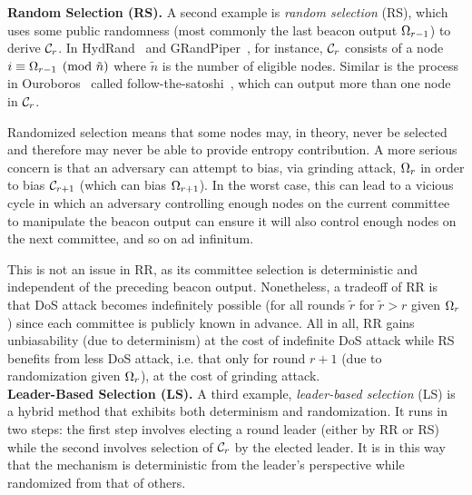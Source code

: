 \noindent\textbf{Random Selection (RS).} A second example is \textit{random selection} (RS), which uses some public randomness (most commonly the last beacon output $\Omega_{r - 1}$) to derive $\mathcal{C}_r$.
In HydRand~\cite{schindler2020hydrand} and GRandPiper~\cite{bhat2020randpiper}, for instance, $\mathcal{C}_r$ consists of a node $i \equiv \Omega_{r - 1} \pmod{\tilde{n}}$ where $\tilde{n}$ is the number of eligible nodes. Similar is the process in Ouroboros~\cite{kiayias2017ouroboros} called follow-the-satoshi~\cite{bentov2014proof,kiayias2017ouroboros}, which can output more than one node in $\mathcal{C}_r$.

Randomized selection means that some nodes may, in theory, never be selected and therefore may never be able to provide entropy contribution. A more serious concern is that an adversary can attempt to bias, via grinding attack, $\Omega_r$ in order to bias $\mathcal{C}_{r + 1}$ (which can bias $\Omega_{r + 1}$). In the worst case, this can lead to a vicious cycle in which an adversary controlling enough nodes on the current committee to manipulate the beacon output can ensure it will also control enough nodes on the next committee, and so on ad infinitum.

This is not an issue in RR, as its committee selection is deterministic and independent of the preceding beacon output. Nonetheless, a tradeoff of RR is that DoS attack becomes indefinitely possible (for all rounds $\tilde{r}$ for $\tilde{r} > r$ given $\Omega_r$) since each committee is publicly known in advance. All in all, RR gains unbiasability (due to determinism) at the cost of indefinite DoS attack while RS benefits from less DoS attack, i.e. that only for round $r + 1$ (due to randomization given $\Omega_r$), at the cost of grinding attack.\\

\noindent\textbf{Leader-Based Selection (LS).} A third example, \textit{leader-based selection} (LS) is a hybrid method that exhibits both determinism and randomization. It runs in two steps: the first step involves electing a round leader (either by RR or RS) while the second involves selection of $\mathcal{C}_r$ by the elected leader. It is in this way that the mechanism is deterministic from the leader's perspective while randomized from that of others.

